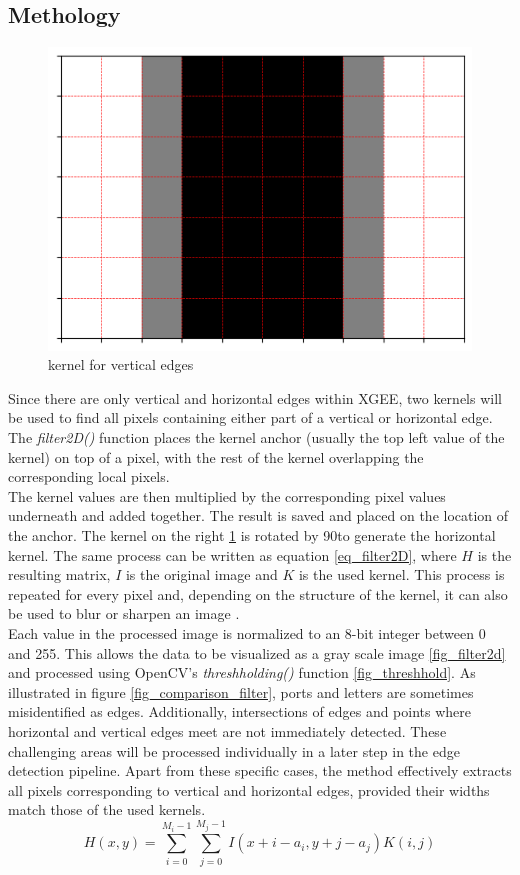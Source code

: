 \subsection{Methology}
\begin{figure}
    \centering
    \includegraphics[width=\linewidth]{Pictures/kernel_ver.png}
    \caption{kernel for vertical edges}
    \label{fig_kernel_ver}
\end{figure}
Since there are only vertical and horizontal edges within XGEE, two kernels will be used to find all pixels containing either part of a vertical or horizontal edge. The \textit{filter2D()} function places the kernel anchor (usually the top left value of the kernel) on top of a pixel, with the rest of the kernel overlapping the corresponding local pixels.\\
The kernel values are then multiplied by the corresponding pixel values underneath and added together. The result is saved and placed on the location of the anchor. The kernel on the right \ref{fig_kernel_ver} is rotated by 90\textdegree  to generate the horizontal kernel. The same process can be written as equation \ref{eq_filter2D}, where $H$ is the resulting matrix, $I$ is the original image and $K$ is the used kernel. This process is repeated for every pixel and, depending on the structure of the kernel, it can also be used to blur or sharpen an image \cite{web_filter2D}.\\
Each value in the processed image is normalized to an 8-bit integer between 0 and 255. This allows the data to be visualized as a gray scale image \ref{fig_filter2d} and processed using OpenCV's \textit{threshholding()} function \ref{fig_threshhold}. As illustrated in figure \ref{fig_comparison_filter}, ports and letters are sometimes misidentified as edges. Additionally, intersections of edges and points where horizontal and vertical edges meet are not immediately detected. These challenging areas will be processed individually in a later step in the edge detection pipeline. Apart from these specific cases, the method effectively extracts all pixels corresponding to vertical and horizontal edges, provided their widths match those of the used kernels.
\begin{equation}
\label{eq_filter2D}
    H(x, y) = \sum_{i=0}^{M_i-1} \sum_{j=0}^{M_j-1} I(x + i - a_i,y + j - a_j)K(i, j)
\end{equation}

